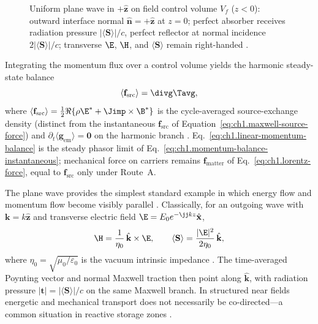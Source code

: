 \begin{figure}[t]
\centering
\VolIPhysFig{\VolIPhysPlaneWaveRadiationPressure}
\caption{Uniform plane wave in $+\hat{\mathbf{z}}$ on field control volume $V_f$ ($z<0$): outward interface normal $\hat{\mathbf{n}}=+\hat{\mathbf{z}}$ at $z=0$; perfect absorber receives radiation pressure $|\langle\mathbf{S}\rangle|/c$, perfect reflector at normal incidence $2|\langle\mathbf{S}\rangle|/c$; transverse $\E$, $\H$, and $\langle\mathbf{S}\rangle$ remain right-handed \cite{stratton1941,maxwell1873}.}
\label{fig:ch1.plane-wave-handedness}
\end{figure}
Integrating the momentum flux over a control volume yields the harmonic steady-state balance
\begin{equation}
\label{eq:ch1.linear-momentum-balance}
\langle\mathbf{f}_{\mathrm{src}}\rangle=\divg\Tavg,
\end{equation}
where \(\langle\mathbf{f}_{\mathrm{src}}\rangle=\tfrac12\Re\{\rho\E^*+\Jimp\times\B^*\}\) is the cycle-averaged source-exchange density (distinct from the instantaneous \(\mathbf{f}_{\mathrm{src}}\) of Equation~\eqref{eq:ch1.maxwell-source-force}) and \(\partial_t\langle\mathbf{g}_{\mathrm{em}}\rangle=\mathbf{0}\) on the harmonic branch \cite{stratton1941}. Eq.~\eqref{eq:ch1.linear-momentum-balance} is the steady phasor limit of Eq.~\eqref{eq:ch1.momentum-balance-instantaneous}; mechanical force on carriers remains \(\mathbf{f}_{\mathrm{matter}}\) of Eq.~\eqref{eq:ch1.lorentz-force}, equal to \(\mathbf{f}_{\mathrm{src}}\) only under Route~A.

\label{eq:ch1.energy-momentum-directional-ratio}
The plane wave provides the simplest standard example in which energy flow and momentum flow become visibly parallel \cite{poynting1884,stratton1941}. Classically, for an outgoing wave with $\mathbf{k}=k\hat{\mathbf{z}}$ and transverse electric field $\E=E_0 e^{-\jj k z}\hat{\mathbf{x}}$,
\begin{equation}
\label{eq:ch1.plane-wave-transverse}
\H=\frac{1}{\eta_0}\,\hat{\mathbf{k}}\times\E,
\qquad
\langle\mathbf{S}\rangle=\frac{|\E|^{2}}{2\eta_0}\,\hat{\mathbf{k}},
\end{equation}
where $\eta_0=\sqrt{\mu_0/\varepsilon_0}$ is the vacuum intrinsic impedance \cite{stratton1941}. The time-averaged Poynting vector and normal Maxwell traction then point along $\hat{\mathbf{k}}$, with radiation pressure $|\mathbf{t}|=|\langle\mathbf{S}\rangle|/c$ on the same Maxwell branch. In structured near fields energetic and mechanical transport does not necessarily be co-directed---a common situation in reactive storage zones \cite{stratton1941}.

